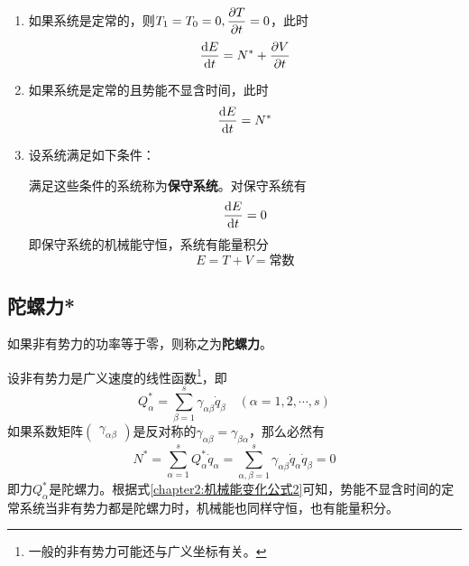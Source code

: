 \begin{enumerate}
\item 如果系统是定常的，则$T_1=T_0=0, \dfrac{\partial T}{\partial t} = 0$，此时
\begin{equation}
	\frac{\mathrm{d} E}{\mathrm{d} t} = N^* + \frac{\partial V}{\partial t}
\end{equation}
\item 如果系统是定常的且势能不显含时间，此时
\begin{equation}
	\frac{\mathrm{d} E}{\mathrm{d} t} = N^*
	\label{chapter2:机械能变化公式2}
\end{equation}
\item 设系统满足如下条件：满足这些条件的系统称为{\bf 保守系统}。对保守系统有
\begin{equation}
	\frac{\mathrm{d} E}{\mathrm{d} t} = 0
\end{equation}
即保守系统的机械能守恒，系统有能量积分
\begin{equation}
	E = T+V = \text{常数}
\end{equation}
\end{enumerate}

\subsection{陀螺力*}

如果非有势力的功率等于零，则称之为{\bf 陀螺力}。

设非有势力是广义速度的线性函数\footnote{一般的非有势力可能还与广义坐标有关。}，即
\begin{equation*}
	Q_\alpha^* = \sum_{\beta=1}^s \gamma_{\alpha\beta}\dot{q}_\beta\quad (\alpha=1,2,\cdots,s)
\end{equation*}
如果系数矩阵$\begin{pmatrix} \gamma_{\alpha\beta} \end{pmatrix}$是反对称的$\gamma_{\alpha\beta}=\gamma_{\beta\alpha}$，那么必然有
\begin{equation*}
	N^* = \sum_{\alpha=1}^s Q_\alpha^*\dot{q}_\alpha = \sum_{\alpha,\beta=1}^s \gamma_{\alpha\beta} \dot{q}_\alpha\dot{q}_\beta = 0
\end{equation*}
即力$Q_\alpha^*$是陀螺力。根据式\eqref{chapter2:机械能变化公式2}可知，势能不显含时间的定常系统当非有势力都是陀螺力时，机械能也同样守恒，也有能量积分。

